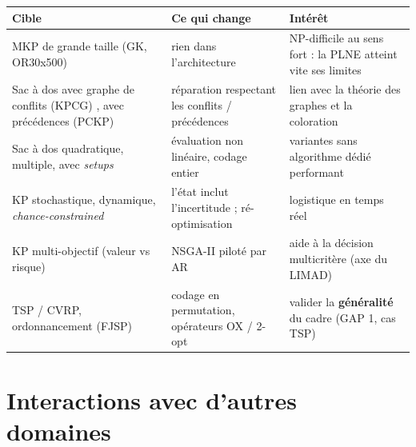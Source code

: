 \documentclass[
  french,
  11pt,
  a4paper,
]{article}
\newcounter{none} %
\begin{document}
{\def\LTcaptype{none} %
\begin{longtable}[]{@{}
  >{\raggedright\arraybackslash}p{}
  >{\raggedright\arraybackslash}p{}
  >{\raggedright\arraybackslash}p{}@{}}
\toprule\noalign{}
\begin{minipage}[b]{\linewidth}\raggedright
Cible
\end{minipage} & \begin{minipage}[b]{\linewidth}\raggedright
Ce qui change
\end{minipage} & \begin{minipage}[b]{\linewidth}\raggedright
Intérêt
\end{minipage} \\
\midrule\noalign{}
\endhead
\bottomrule\noalign{}
\endlastfoot
MKP de grande taille (GK, OR30x500) & rien dans l'architecture &
NP-difficile au sens fort : la PLNE atteint vite ses limites \\
Sac à dos avec graphe de conflits (KPCG)
\autocite{pferschy_knapsack_2009}, avec précédences (PCKP) & réparation
respectant les conflits / précédences & lien avec la théorie des graphes
et la coloration \\
Sac à dos quadratique, multiple, avec \emph{setups}
\autocite{cacchiani_knapsack_2022} & évaluation non linéaire, codage
entier & variantes sans algorithme dédié performant \\
KP stochastique, dynamique, \emph{chance-constrained} & l'état inclut
l'incertitude ; ré-optimisation & logistique en temps réel \\
KP multi-objectif (valeur vs risque) & NSGA-II \autocite{deb_fast_2002}
piloté par AR & aide à la décision multicritère (axe du LIMAD) \\
TSP / CVRP, ordonnancement (FJSP) & codage en permutation, opérateurs OX
/ 2-opt & valider la \textbf{généralité} du cadre (GAP 1, cas TSP)
\autocite{chen_slga_2020} \\
\end{longtable}
}

\section{Interactions avec d'autres
domaines}\label{perspectives-interactions-avec-dautres-domaines}
\end{document}
